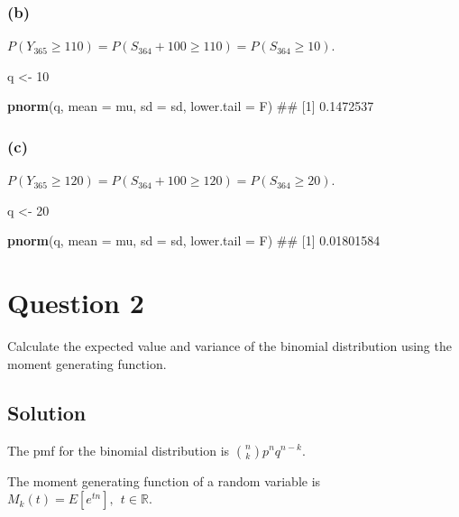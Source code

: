 \documentclass[]{article}
\newenvironment{Shaded}{\begin{snugshade}}{\end{snugshade}}
\newcommand{\KeywordTok}[1]{\textcolor[rgb]{0.13,0.29,0.53}{\textbf{#1}}}
\newcommand{\DataTypeTok}[1]{\textcolor[rgb]{0.13,0.29,0.53}{#1}}
\newcommand{\DecValTok}[1]{\textcolor[rgb]{0.00,0.00,0.81}{#1}}
\newcommand{\StringTok}[1]{\textcolor[rgb]{0.31,0.60,0.02}{#1}}
\newcommand{\NormalTok}[1]{#1}
\begin{document}
\subsubsection{(b)}\label{b}

\(P(Y_{365} \geq 110) = P(S_{364} + 100 \geq 110) = P(S_{364} \geq 10)\).

\begin{Shaded}
\begin{Highlighting}[]
\NormalTok{q <-}\StringTok{ }\DecValTok{10}

\KeywordTok{pnorm}\NormalTok{(q, }\DataTypeTok{mean =}\NormalTok{ mu, }\DataTypeTok{sd =}\NormalTok{ sd, }\DataTypeTok{lower.tail =}\NormalTok{ F)}
\NormalTok{## [1] 0.1472537}
\end{Highlighting}
\end{Shaded}

\subsubsection{(c)}\label{c}

\(P(Y_{365} \geq 120) = P(S_{364} + 100 \geq 120) = P(S_{364} \geq 20)\).

\begin{Shaded}
\begin{Highlighting}[]
\NormalTok{q <-}\StringTok{ }\DecValTok{20}

\KeywordTok{pnorm}\NormalTok{(q, }\DataTypeTok{mean =}\NormalTok{ mu, }\DataTypeTok{sd =}\NormalTok{ sd, }\DataTypeTok{lower.tail =}\NormalTok{ F)}
\NormalTok{## [1] 0.01801584}
\end{Highlighting}
\end{Shaded}

\section{Question 2}\label{question-2}

Calculate the expected value and variance of the binomial distribution
using the moment generating function.

\subsection{Solution}\label{solution-1}

The pmf for the binomial distribution is \(\binom{n}{k}p^{n}q^{n-k}\).

The moment generating function of a random variable is
\(M_k(t) = E[e^{tn}], \ \ t \in \mathbb{R}\).
\end{document}
